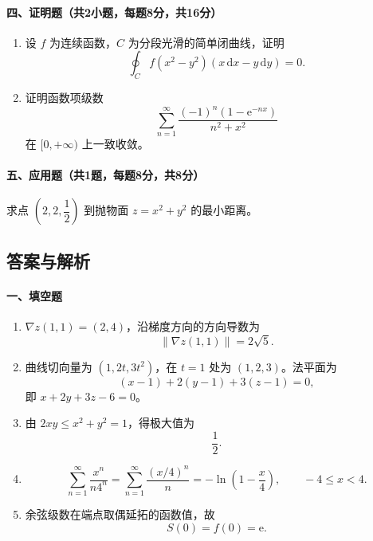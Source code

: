 \paragraph*{四、证明题（共2小题，每题8分，共16分）}
\begin{enumerate}
  \item 设 \(f\) 为连续函数，\(C\) 为分段光滑的简单闭曲线，证明
  \[
    \oint_C f(x^2-y^2)(x\,\mathrm{d}x-y\,\mathrm{d}y)=0.
  \]
  \item 证明函数项级数
  \[
    \sum_{n=1}^{\infty}\frac{(-1)^n(1-\mathrm{e}^{-nx})}{n^2+x^2}
  \]
  在 \([0,+\infty)\) 上一致收敛。
\end{enumerate}

\paragraph*{五、应用题（共1题，每题8分，共8分）}
求点 \(\left(2,2,\dfrac12\right)\) 到抛物面 \(z=x^2+y^2\) 的最小距离。

\subsection{答案与解析}
\paragraph*{一、填空题}
\begin{enumerate}
  \item \(\nabla z(1,1)=(2,4)\)，沿梯度方向的方向导数为
  \[
    \|\nabla z(1,1)\|=2\sqrt5.
  \]
  \item 曲线切向量为 \((1,2t,3t^2)\)，在 \(t=1\) 处为 \((1,2,3)\)。法平面为
  \[
    (x-1)+2(y-1)+3(z-1)=0,
  \]
  即 \(x+2y+3z-6=0\)。
  \item 由 \(2xy\le x^2+y^2=1\)，得极大值为
  \[
    \frac12.
  \]
  \item
  \[
    \sum_{n=1}^{\infty}\frac{x^n}{n4^n}
    =\sum_{n=1}^{\infty}\frac{(x/4)^n}{n}
    =-\ln\left(1-\frac x4\right),\qquad -4\le x<4.
  \]
  \item 余弦级数在端点取偶延拓的函数值，故
  \[
    S(0)=f(0)=\mathrm{e}.
  \]
\end{enumerate}

